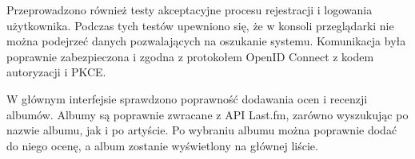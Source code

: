 	Przeprowadzono również testy akceptacyjne procesu rejestracji i logowania użytkownika.
	Podczas tych testów upewniono się, że w konsoli przeglądarki nie można podejrzeć danych pozwalających na oszukanie systemu.
	Komunikacja była poprawnie zabezpieczona i zgodna z protokołem OpenID Connect z kodem autoryzacji i PKCE.

	W głównym interfejsie sprawdzono poprawność dodawania ocen i recenzji albumów.
	Albumy są poprawnie zwracane z API Last.fm, zarówno wyszukując po nazwie albumu, jak i po artyście.
	Po wybraniu albumu można poprawnie dodać do niego ocenę, a album zostanie wyświetlony na głównej liście.

